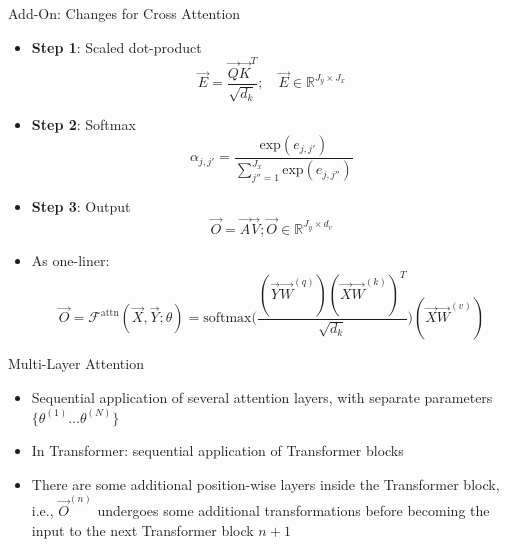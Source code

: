 
\begin{vbframe}{Add-On: Changes for Cross Attention}

\vfill

\begin{itemize}
	  \item \textbf{Step 1}: Scaled dot-product $$\vec {E} = \frac{ \vec {Q} \vec {K}^T}{\sqrt{d_k}}; \quad \vec E \in \mathbb{R}^{J_y \times J_x}$$
	  \item \textbf{Step 2}: Softmax $$\alpha_{j,j'} = \frac{\mathrm{exp}(e_{j,j'})}{\sum_{j''=1}^{J_x} \mathrm{exp}(e_{j,j''})}$$
		\item \textbf{Step 3}: Output $$\vec {O} = \vec {A} \vec {V}; \vec O \in \mathbb{R}^{J_y \times d_v}$$
		\item As one-liner: $$ \vec O = \mathcal{F}^\mathrm{attn}(\vec X, \vec Y; \theta) = \mathrm{softmax}\Big(\frac{(\vec Y\vec W^{(q)} ) (\vec X\vec W^{(k)} )^T}{\sqrt{d_k}}\Big)(\vec X\vec W^{(v)} ) $$
\end{itemize}

\vfill

\end{vbframe}


\begin{vbframe}{Multi-Layer Attention}

\vfill

\begin{itemize}
\item Sequential application of several attention layers, with separate parameters $\{\theta^{(1)} \ldots \theta^{(N)}\}$ 
\item In Transformer: sequential application of Transformer blocks
\item There are some additional position-wise layers inside the Transformer block, i.e., $\vec O^{(n)}$ undergoes some additional transformations before becoming the input to the next Transformer block $n+1$
\end{itemize}

\vfill

\end{vbframe}


